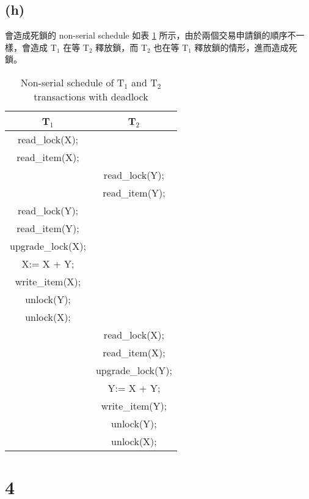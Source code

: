 \documentclass{article}
\begin{document}
\subsection*{(h)}
會造成死鎖的 non-serial schedule 如表 \ref{tab:2_h} 所示，由於兩個交易申請鎖的順序不一樣，會造成 T$_1$ 在等 T$_2$ 釋放鎖，而 T$_2$ 也在等 T$_1$ 釋放鎖的情形，進而造成死鎖。
\begin{table}[H]
    \centering
    \begin{tabular}{|c|c|}
    \toprule
    \textbf{T$_1$} & \textbf{T$_2$} \\
    \midrule
    read\_lock(X); & \\
    read\_item(X); & \\
    & read\_lock(Y); \\
    & read\_item(Y); \\
    read\_lock(Y); & \\
    read\_item(Y); & \\
    upgrade\_lock(X); & \\
    X:= X + Y; &  \\
    write\_item(X); & \\
    unlock(Y); & \\
    unlock(X); & \\
    & read\_lock(X); \\
    & read\_item(X); \\
    & upgrade\_lock(Y); \\
    & Y:= X + Y; \\
    & write\_item(Y); \\
    & unlock(Y); \\
    & unlock(X); \\
    \bottomrule
    \end{tabular}
    \caption{Non-serial schedule of T$_1$ and T$_2$ transactions with deadlock}
    \label{tab:2_h}
\end{table}



\section*{4}
\end{document}
